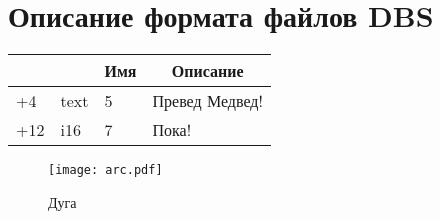 
\chapter{
  Описание формата файлов DBS
}
\label{app:dbs}

\newcommand{\dbsRecord}[1]{
  \noindent
  \begin{tabularx}{\textwidth}{|>{\raggedleft}p{3em}|>{\centering}p{4em}|p{3em}|X|}
    \hline
    \multicolumn{1}{|c|}{Смещение} &
    \multicolumn{1}{c|}{Тип}      &
    \multicolumn{1}{c|}{Имя}      &
    \multicolumn{1}{c|}{Описание}     \\
    \hline
    #1
    \\
    \hline
  \end{tabularx}
}

\dbsRecord{
  +4 & text & 5 & Превед Медвед! \\
  +12 & i16 & 7 & Пока!
}

\begin{figure}
  \centering
  \texttt{[image: arc.pdf]}
  \caption{Дуга}
  \label{fig:app.arc}
\end{figure}
